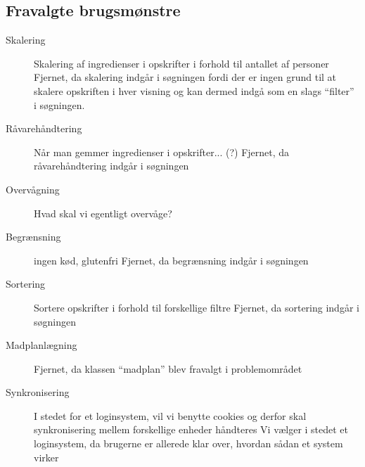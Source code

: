 \subsection{Fravalgte brugsmønstre}
\label{ap:fravalgtebrugsmoenstre}
\begin{description}
  \item[Skalering] Skalering af ingredienser i opskrifter i forhold til antallet af personer
Fjernet, da skalering indgår i søgningen fordi der er ingen grund til at skalere opskriften i hver visning og kan dermed indgå som en slags “filter” i søgningen.

\item[Råvarehåndtering] Når man gemmer ingredienser i opskrifter... (?)
Fjernet, da råvarehåndtering indgår i søgningen

\item[Overvågning] Hvad skal vi egentligt overvåge?

\item[Begrænsning] \fx ingen kød, glutenfri
Fjernet, da begrænsning indgår i søgningen

\item[Sortering] Sortere opskrifter i forhold til forskellige filtre
Fjernet, da sortering indgår i søgningen

\item[Madplanlægning] Fjernet, da klassen ``madplan'' blev fravalgt i problemområdet

\item[Synkronisering] I stedet for et loginsystem, vil vi benytte cookies og derfor skal synkronisering mellem forskellige enheder håndteres
Vi vælger i stedet et loginsystem, da brugerne er allerede klar over, hvordan sådan et system virker
  
\end{description}
